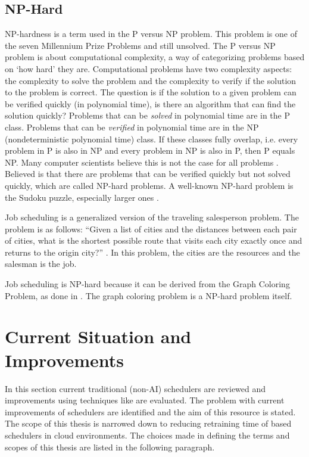 \subsection{NP-Hard}

NP-hardness is a term used in the P versus NP problem. This problem is one of
the seven Millennium Prize Problems \cite{carlson2006} and still unsolved. The
P versus NP problem is about computational complexity, a way of categorizing
problems based on `how hard' they are. Computational problems have two
complexity aspects: the complexity to solve the problem and the complexity to
verify if the solution to the problem is correct. The question is if the
solution to a given problem can be verified quickly (in polynomial time), is
there an algorithm that can find the solution quickly? Problems that can be
\emph{solved} in polynomial time are in the P class. Problems that can be
\emph{verified} in polynomial time are in the NP (nondeterministic polynomial
time) class. If these classes fully overlap, i.e. every problem in P is also
in NP and every problem in NP is also in P, then P equals NP. Many computer
scientists believe this is not the case for all problems
\cite{rosenberger2012}. Believed is that there are problems that can be
verified quickly but not solved quickly, which are called NP-hard problems. A
well-known NP-hard problem is the Sudoku puzzle, especially larger ones
\cite{yato2003}.

Job scheduling is a generalized version of the traveling salesperson problem.
The problem is as follows: ``Given a list of cities and the distances between
each pair of cities, what is the shortest possible route that visits each city
exactly once and returns to the origin city?'' \cite{flood1956}. In this
problem, the cities are the resources and the salesman is the job.

Job scheduling is NP-hard because it can be derived from the Graph Coloring
Problem, as done in . The graph coloring problem is a NP-hard
problem itself.

\section{Current Situation and Improvements}\label{sec:situ}

In this section current traditional (non-AI) schedulers are reviewed and
improvements using \ai techniques like \rl are
evaluated. The problem with current \ai improvements of schedulers are
identified and the aim of this resource is stated. The scope of this thesis is
narrowed down to reducing retraining time of \rl based schedulers in cloud
environments. The choices made in defining the terms and scopes of this thesis
are listed in the following paragraph.

